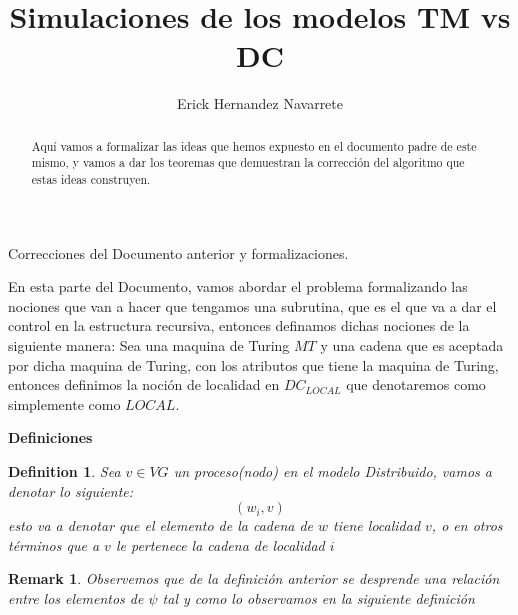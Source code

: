 \documentclass[10pt]{article}
\author{Erick Hernandez Navarrete}
\title{Simulaciones de los modelos TM vs DC}
\newtheorem*{remark}{Remark}
\newtheorem{definition}{Definition}[section]
\begin{document}
    \begin{titlepage}
        \begin{large}
            Correcciones del Documento anterior y formalizaciones.
        \end{large}
    \end{titlepage}

    \begin{abstract}
        Aquí vamos a formalizar las ideas que hemos expuesto en el documento
        padre de este mismo, y vamos a dar los teoremas que demuestran la corrección del
        algoritmo que estas ideas construyen.
    \end{abstract}
    \space

    En esta parte del Documento, vamos abordar el problema formalizando las nociones
    que van a hacer que tengamos una subrutina, que es el que va a dar el control en
    la estructura recursiva, entonces definamos dichas nociones de la siguiente manera:
    \space
    Sea una maquina de Turing $MT$ y una cadena que es aceptada por dicha maquina de Turing, con los atributos que tiene la maquina de Turing,
    entonces definimos la noción de localidad en $DC_{LOCAL}$ que denotaremos como
    simplemente como $LOCAL$.
    \begin{center}
        \textbf{Definiciones}
    \end{center}
    \begin{definition}
        Sea $v \in VG$ un proceso(nodo) en el modelo Distribuido,
        vamos a denotar lo siguiente:
        \begin{equation}
            (w_{i},v)
        \end{equation}
        esto va a denotar que el elemento de la cadena de $w$ tiene localidad $v$,
        o en otros términos que a $v$ le pertenece la cadena de localidad $i$
    \end{definition}
    \begin{remark}
        Observemos que de la definición anterior se desprende una relación entre los elementos
        de $\psi$ tal y como lo observamos en la siguiente definición
    \end{remark}
\end{document}
